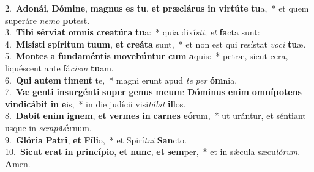 {2.~}\textbf{A}\textbf{do}\textbf{ná}\textbf{i}, \textbf{Dó}\textbf{mi}\textbf{ne}, \textbf{ma}\textbf{gnus} \textbf{es} \textbf{tu}, \textbf{et} \textbf{præ}\textbf{clá}\textbf{rus} \textbf{in} \textbf{vir}\textbf{tú}\textbf{te} \textbf{tu}a,~* et quem superáre \textit{ne}\textit{mo} \textbf{po}test.\\
{3.~}\textbf{Ti}\textbf{bi} \textbf{sér}\textbf{vi}\textbf{at} \textbf{om}\textbf{nis} \textbf{cre}\textbf{a}\textbf{tú}\textbf{ra} \textbf{tu}a:~* quia dixí\textit{sti}, \textit{et} \textbf{fa}cta sunt:\\
{4.~}\textbf{Mi}\textbf{sí}\textbf{sti} \textbf{spí}\textbf{ri}\textbf{tum} \textbf{tu}\textbf{um}, \textbf{et} \textbf{cre}\textbf{á}\textbf{ta} sunt,~* et non est qui resístat \textit{vo}\textit{ci} \textbf{tu}æ.\\
{5.~}\textbf{Mon}\textbf{tes} \textbf{a} \textbf{fun}\textbf{da}\textbf{mén}\textbf{tis} \textbf{mo}\textbf{ve}\textbf{bún}\textbf{tur} \textbf{cum} \textbf{a}quis:~* petræ, sicut cera, liquéscent ante fá\textit{ci}\textit{em} \textbf{tu}am.\\
{6.~}\textbf{Qui} \textbf{au}\textbf{tem} \textbf{ti}\textbf{ment} te,~* magni erunt apud \textit{te} \textit{per} \textbf{óm}nia.\\
{7.~}\textbf{Væ} \textbf{gen}\textbf{ti} \textbf{in}\textbf{sur}\textbf{gén}\textbf{ti} \textbf{su}\textbf{per} \textbf{ge}\textbf{nus} \textbf{me}\textbf{um}: \textbf{Dó}\textbf{mi}\textbf{nus} \textbf{e}\textbf{nim} \textbf{om}\textbf{ní}\textbf{po}\textbf{tens} \textbf{vin}\textbf{di}\textbf{cá}\textbf{bit} \textbf{in} \textbf{e}is,~* in die judícii visi\textit{tá}\textit{bit} \textbf{il}los.\\
{8.~}\textbf{Da}\textbf{bit} \textbf{e}\textbf{nim} \textbf{i}\textbf{gnem}, \textbf{et} \textbf{ver}\textbf{mes} \textbf{in} \textbf{car}\textbf{nes} \textbf{e}\textbf{ó}rum,~* ut urántur, et séntiant usque in \textit{sem}\textit{pi}\textbf{tér}num.\\
{9.~}\textbf{Gló}\textbf{ri}\textbf{a} \textbf{Pa}\textbf{tri}, \textbf{et} \textbf{Fí}\textbf{li}o,~* et Spirí\textit{tu}\textit{i} \textbf{San}cto.\\
{10.~}\textbf{Si}\textbf{cut} \textbf{e}\textbf{rat} \textbf{in} \textbf{prin}\textbf{cí}\textbf{pi}\textbf{o}, \textbf{et} \textbf{nunc}, \textbf{et} \textbf{sem}per,~* et in sǽcula sæcu\textit{ló}\textit{rum}. \textbf{A}men.\\

